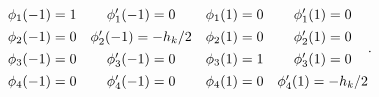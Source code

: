 \documentclass{AeroStructure-ERJohnson}
\begin{document}
\begin{align}\label{eq17.141}
\begin{array}{@{}cccc@{}}\phi_{1}(-1)=1 & \phi_{1}^{\prime}(-1)=0 & \phi_{1}(1)=0 & \phi_{1}^{\prime}(1)=0 \\[4pt]\phi_{2}(-1)=0 & \phi_{2}^{\prime}(-1)=-h_{k}/2 & \phi_{2}(1)=0 & \phi_{2}^{\prime}(1)=0 \\[4pt]\phi_{3}(-1)=0 & \phi_{3}^{\prime}(-1)=0 & \phi_{3}(1)=1 & \phi_{3}^{\prime}(1)=0 \\[4pt]\phi_{4}(-1)=0 & \phi_{4}^{\prime}(-1)=0 & \phi_{4}(1)=0 & \phi_{4}^{\prime}(1)=-h_{k}/2\end{array}.
\end{align}

{\def\thefigure{17.24}
}
\end{document}
